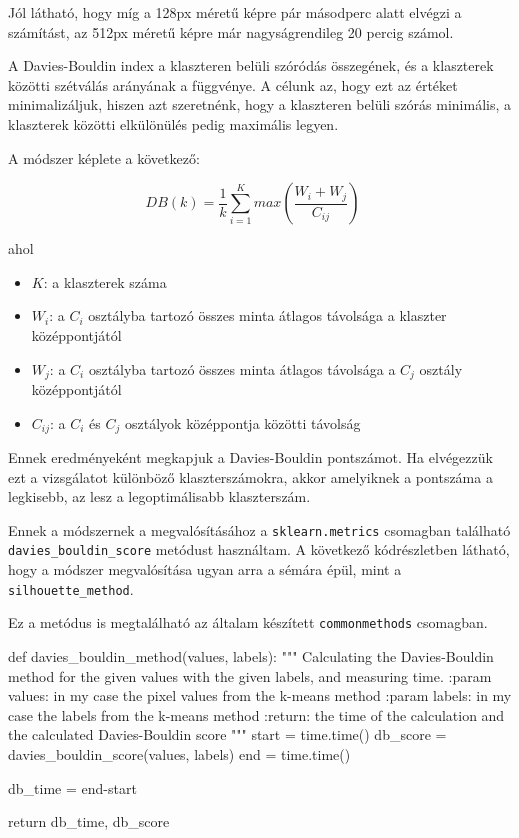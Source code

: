 Jól látható, hogy míg a 128px méretű képre pár másodperc alatt elvégzi a számítást, az 512px méretű képre már nagyságrendileg 20 percig számol.

A Davies-Bouldin index a klaszteren belüli szóródás összegének, és a klaszterek közötti szétválás arányának a függvénye. A célunk az, hogy ezt az értéket minimalizáljuk, hiszen azt szeretnénk, hogy a klaszteren belüli szórás minimális, a klaszterek közötti elkülönülés pedig maximális legyen.

A módszer képlete a következő:

\[ DB(k)=\frac{1}{k} \sum_{i=1}^{K} max \left(\frac{W_i + W_j}{C_{ij}}\right)  \quad \]

\noindent ahol
\begin{itemize}
\item $K$: a klaszterek száma
\item $W_i$: a $C_i$ osztályba tartozó összes minta átlagos távolsága a klaszter középpontjától
\item $W_{j}$: a $C_i$ osztályba tartozó összes minta átlagos távolsága a $C_j$ osztály középpontjától
\item $C_{ij}$: a $C_i$ és $C_j$ osztályok középpontja közötti távolság
\end{itemize}
Ennek eredményeként megkapjuk a Davies-Bouldin pontszámot. Ha elvégezzük ezt a vizsgálatot különböző klaszterszámokra, akkor amelyiknek a pontszáma a legkisebb, az lesz a legoptimálisabb klaszterszám. \cite{tomatoleaf}

Ennek a módszernek a megvalósításához a \texttt{sklearn.metrics} csomagban található \texttt{davies\_bouldin\_score} metódust használtam. A következő kódrészletben látható, hogy a módszer megvalósítása ugyan arra a sémára épül, mint a \texttt{silhouette\_method}.

Ez a metódus is megtalálható az általam készített \texttt{commonmethods} csomagban.
\begin{python}
def davies_bouldin_method(values, labels):
    """
    Calculating the Davies-Bouldin method for the given values with
    the given labels, and measuring time.
    :param values: in my case the pixel values from the k-means method
    :param labels: in my case the labels from the k-means method
    :return: the time of the calculation and
        the calculated Davies-Bouldin score
    """
    start = time.time()
    db_score = davies_bouldin_score(values, labels)
    end = time.time()

    db_time = end-start

    return db_time, db_score
\end{python}

